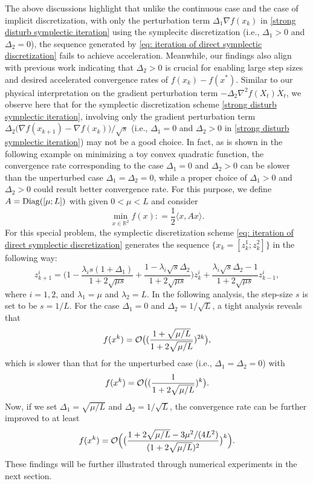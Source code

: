 \documentclass[11pt]{article}
\newcommand{\1}{\mathbf 1}
\def\inprod#1#2{\langle#1,#2\rangle}
\numberwithin{equation}{section}
\begin{document}
The above discussions highlight that
unlike the continuous case and the case of implicit discretization, with only the perturbation term $\Delta_1\nabla f(x_k)$ in \eqref{strong disturb symplectic iteration} using the symplecitc discretization (i.e., $\Delta_1 >0$ and $\Delta_2 =0$), the sequence generated by \eqref{eq: iteration of direct symplectic discretization} fails to achieve acceleration. Meanwhile, our findings also align with previous work indicating that $\Delta_2 >0$ is crucial for enabling large step sizes and desired accelerated convergence rates of $f(x_k)-f(x^*)$. Similar to our physical interpretation on the gradient perturbation term $-\Delta_2 \nabla^2 f(X_t) \dot{X_t}$, we observe here that for the symplectic discretization scheme \eqref{strong disturb symplectic iteration}, involving only the gradient perturbation term $\Delta_2\big(\nabla f(x_{k+1})-\nabla f(x_k)\big)/\sqrt{s}$ (i.e., $\Delta_1 =0$ and $\Delta_2 >0$ in \eqref{strong disturb symplectic iteration}) may not be a good choice. In fact, as is shown in the following example on minimizing a toy convex quadratic function, the convergence rate corresponding to the case $\Delta_1 =0$ and $\Delta_2 >0$  can be slower than the unperturbed case $\Delta_1 = \Delta_2 = 0$, while a proper choice of $\Delta_1 >0$ and $\Delta_2 >0$ could result better convergence rate. For this purpose, we define $A = {\rm Diag}([\mu; L])$ with given $0 < \mu < L$ and consider 
\[ \min_{x\in\mathbb{R}^2} f(x): = \frac{1}{2} \inprod{x}{Ax}. \]
For this special problem, the symplectic discretization scheme \eqref{eq: iteration of direct symplectic discretization} generates the sequence $\{x_k = [z_k^1; z^2_k]\}$ in the following way:
\begin{equation*}
    \label{eq: one dimension iteration}
    z_{k+1}^i=\big(1-\frac{\lambda_i s (1+\Delta_1)}{1+2\sqrt{\mu s}}+\frac{1-\lambda_i\sqrt{s} \Delta_2}{1+2\sqrt{\mu s}}\big)z_k^i+\frac{\lambda_i \sqrt{s}\Delta_2-1}{1+2\sqrt{\mu s}}z_{k-1}^i,%
\end{equation*}
where $i=1,2$, and $\lambda_1 = \mu$ and $\lambda_2 = L$. In the following analysis, the step-size $s$ is set to be $s = 1/L$. For the case $\Delta_1 =0$ and $\Delta_2 = 1/\sqrt{L}$, a tight analysis reveals that 
\[
f(x^k) = {\cal O}\big ((\frac{1+\sqrt{\mu/L}}{1+2\sqrt{\mu/L}} )^{2k}\big ),
\] 
which is slower than that for the unperturbed case (i.e., $\Delta_1 = \Delta_2 = 0$) with
\[
f(x^k) = {\cal O}\big ((\frac{1}{1+2\sqrt{\mu/L}} )^{k}\big ).
\] 
Now, if we set $\Delta_1 = \sqrt{\mu/L}$ and $\Delta_2 = 1/\sqrt{L}$, the convergence rate can be further improved to at least
\[
f(x^k) = {\cal O}\Big (\big(\frac{1+2\sqrt{\mu/L}-3\mu^2/(4L^2)}{(1+2\sqrt{\mu/L})^2} \big)^{k}\Big ).
\]
These findings will be further illustrated through numerical experiments in the next section.
\end{document}
